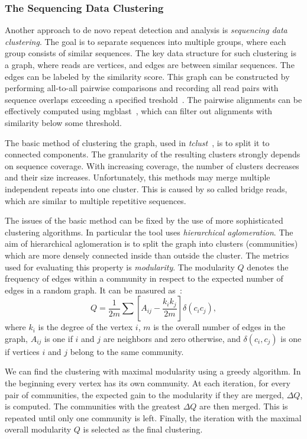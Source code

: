 \subsubsection{The Sequencing Data Clustering}

Another approach to de novo repeat detection and analysis is \emph{sequencing data clustering}. The goal is to separate sequences into multiple groups, where each group consists of similar sequences.
The key data structure for such clustering is a graph, where reads are vertices, and edges are between similar sequences. The edges can be labeled by the similarity score. This graph can be constructed by performing all-to-all pairwise comparisons and recording all read pairs with sequence overlaps exceeding a specified treshold~\cite{pertea2003tigr, novak2010graph}. The pairwise alignments can be effectively computed using mgblast~\cite{pertea2003tigr}, which can filter out alignments with similarity below some threshold.

The basic method of clustering the graph, used in \emph{tclust}~\cite{pertea2003tigr}, is to split it to connected components. The granularity of the resulting clusters strongly depends on sequence coverage.
With increasing coverage, the number of clusters decreases and their size increases.
Unfortunately, this methods may merge multiple independent repeats into one cluster. This is caused by so called bridge reads, which are similar to multiple repetitive sequences.

The issues of the basic method can be fixed by the use of more sophisticated clustering algorithms. In particular the tool  uses \emph{hierarchical aglomeration}. The aim of hierarchical aglomeration is to split the graph into clusters (communities) which are more densely connected inside than outside the cluster. The metrics used for evaluating this property is \emph{modularity}.
The modularity $Q$ denotes the frequency of edges within a community in respect to the expected number of edges in a random graph. It can be masured as~\cite{novak2010graph}:
$$Q = \frac{1}{2m}\sum\left[A_{ij}-\frac{k_i k_j}{2m}\right] \delta(c_i c_j),$$
where $k_i$ is the degree of the vertex $i$, $m$ is the overall number of edges in the graph, $A_{ij}$ is one if $i$ and $j$ are neighbors and zero otherwise, and $\delta(c_i, c_j)$ is one if vertices $i$ and $j$ belong to the same community.

We can find the clustering with maximal modularity using a greedy algorithm. In the beginning every vertex has its own community.
At each iteration, for every pair of communities, the expected gain to the modularity if they are merged, $\Delta Q$, is computed. The communities with the greatest $\Delta Q$ are then merged. This is repeated until only one community is left. Finally, the iteration with the maximal overall modularity $Q$ is selected as the final clustering.

